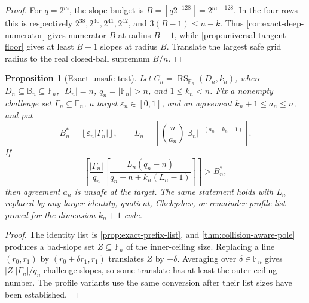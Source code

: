 \documentclass[11pt,a4paper]{amsart}
\numberwithin{equation}{section}
\newtheorem{proposition}[proposition]{Proposition}
\theoremstyle{remark}
\DeclareMathOperator{\RS}{RS}
\newcommand{\F}{\mathbb F}
\newcommand{\B}{\mathbb B}
\newcommand{\eps}{\varepsilon}
\newcommand{\abs}[1]{\lvert #1\rvert}
\newcommand{\floor}[1]{\left\lfloor #1\right\rfloor}
\begin{document}
\begin{proof}
For \(q=2^m\), the slope budget is
\(B=\floor{q2^{-128}}=2^{m-128}\).  In the four rows this is respectively
\(2^{38},2^{40},2^{41},2^{42}\), and
\(3(B-1)\le n-k\).  Thus
\cref{cor:exact-deep-numerator} gives numerator \(B\) at radius
\(B-1\), while \cref{prop:universal-tangent-floor} gives at least
\(B+1\) slopes at radius \(B\).  Translate the largest safe grid radius
to the real closed-ball supremum \(B/n\).
\end{proof}

\begin{proposition}[Exact unsafe test]\label{prop:simple-pole-lower}
Let \(C_n=\RS_{\F_n}(D_n,k_n)\), where
\(D_n\subseteq\B_n\subseteq\F_n\), \(\abs{D_n}=n\),
\(q_n=\abs{\F_n}>n\), and \(1\le k_n<n\).  Fix a nonempty challenge
set \(\Gamma_n\subseteq\F_n\), a target \(\eps_n\in[0,1]\), and an
agreement \(k_n+1\le a_n\le n\), and put
\[
 B_n^*=\floor{\eps_n\abs{\Gamma_n}},\qquad
 L_n=\left\lceil
 \binom n{a_n}\abs{\B_n}^{-(a_n-k_n-1)}
 \right\rceil.
\]
If
\[
 \left\lceil \frac{\abs{\Gamma_n}}{q_n}
 \left\lceil
 \frac{L_n(q_n-n)}{q_n-n+k_n(L_n-1)}
 \right\rceil\right\rceil>B_n^*,
 \tag{UT1}\label{eq:exact-unsafe-budget}
\]
then agreement \(a_n\) is unsafe at the target.  The same statement holds
with \(L_n\) replaced by any larger identity, quotient, Chebyshev, or
remainder-profile list proved for the dimension-\(k_n+1\) code.
\end{proposition}

\begin{proof}
The identity list is \cref{prop:exact-prefix-list}, and
\cref{thm:collision-aware-pole} produces a bad-slope set \(Z\subseteq\F_n\)
of the inner-ceiling size.  Replacing a line \((r_0,r_1)\) by
\((r_0+\delta r_1,r_1)\) translates \(Z\) by \(-\delta\).  Averaging over
\(\delta\in\F_n\) gives \(\abs Z\abs{\Gamma_n}/q_n\) challenge slopes, so
some translate has at least the outer-ceiling number.  The profile variants
use the same conversion after their list sizes have been established.
\end{proof}
\end{document}
